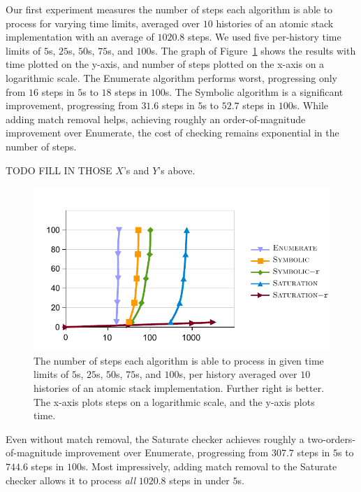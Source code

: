 Our first experiment measures the number of steps each algorithm is able to
process for varying time limits, averaged over $10$ histories of an atomic
stack implementation with an average of $1020.8$ steps. We used five
per-history time limits of $5$s, $25$s, $50$s, $75$s, and $100$s. The graph of
Figure~\ref{fig:steprace} shows the results with time plotted on the y-axis,
and number of steps plotted on the x-axis on a logarithmic scale. The {\sc
Enumerate} algorithm performs worst, progressing only from $16$ steps in $5$s to
$18$ steps in $100$s. The {\sc Symbolic} algorithm is a significant improvement,
progressing from $31.6$ steps in $5$s to $52.7$ steps in $100$s. While adding match
removal helps, achieving roughly an order-of-magnitude improvement over {\sc
Enumerate}, the cost of checking remains exponential in the number of steps.

TODO FILL IN THOSE $X$'s and $Y$'s above.

\begin{figure}[t]
  \centering
  \includegraphics[width=\linewidth]{figures/chart_efficiency}
  \caption{The number of steps each algorithm is able to process in given time
  limits of $5$s, $25$s, $50$s, $75$s, and $100$s, per history averaged over
  $10$ histories of an atomic stack implementation. Further right is better.
  The x-axis plots steps on a logarithmic scale, and the y-axis plots time.}
  \label{fig:steprace}
\end{figure}

Even without match removal, the {\sc Saturate} checker achieves roughly a
two-orders-of-magnitude improvement over {\sc Enumerate}, progressing from $307.7$
steps in $5$s to $744.6$ steps in $100$s. Most impressively, adding match removal
to the {\sc Saturate} checker allows it to process \emph{all} $1020.8$ steps in
under $5$s.

